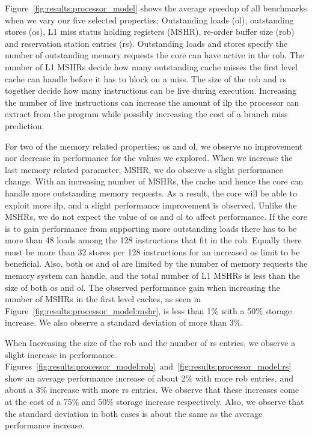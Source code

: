 Figure~\ref{fig:results:processor_model} shows the average speedup of all benchmarks when we vary our five selected properties; Outstanding loads (ol), outstanding stores (os), L1 miss status holding registers (MSHR), re-order buffer size (rob) and reservation station entries (rs).
Outstanding loads and stores specify the number of outstanding memory requests the core can have active in the rob.
The number of L1 MSHRs decide how many outstanding cache misses the first level cache can handle before it has to block on a miss.
The size of the rob and rs together decide how many instructions can be live during execution.  
Increasing the number of live instructions can increase the amount of \gls{ilp} the processor can extract from the program while possibly increasing the cost of a branch miss prediction.

For two of the memory related properties; os and ol, we observe no improvement nor decrease in performance for the values we explored.
When we increase the last memory related parameter, MSHR, we do observe a slight performance change.
With an increasing number of MSHRs, the cache and hence the core can handle more outstanding memory requests. 
As a result, the core will be able to exploit more \gls{ilp}, and a slight performance improvement is observed. 
Unlike the MSHRs, we do not expect the value of os and ol to affect performance. 
If the core is to gain performance from supporting more outstanding loads there has to be more than 48 loads among the 128 instructions that fit in the rob. 
Equally there must be more than 32 stores per 128 instructions for an increased os limit to be beneficial.
Also, both os and ol are limited by the number of memory requests the memory system can handle, and the total number of L1 MSHRs is less than the size of both os and ol.
The observed performance gain when increasing the number of MSHRs in the first level caches, as seen in Figure~\ref{fig:results:processor_model:mshr}, is less than 1\% with a 50\% storage increase. 
We also observe a standard deviation of more than 3\%. 

When Increasing the size of the rob and the number of rs entries, we observe a slight increase in performance.
Figures~\ref{fig:results:processor_model:rob}~and~\ref{fig:results:processor_model:rs} show an average performance increase of about 2\% with more rob entries, and about a 3\% increase with more rs entries.
We observe that these increases come at the cost of a 75\% and 50\% storage increase respectively.
Also, we observe that the standard deviation in both cases is about the same as the average performance increase.

